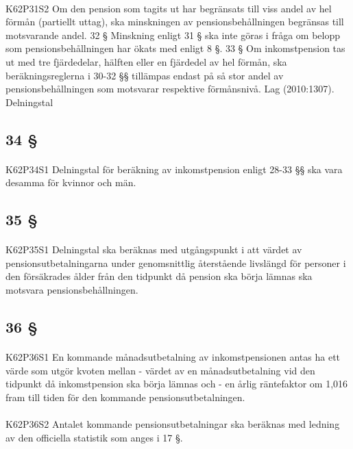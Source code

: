 \documentclass[a4paper,notitlepage,openany,10pt]{book}
\begin{document}
\paragraph*{}
{\tiny K62P31S2}
Om den pension som tagits ut har begränsats till viss andel av hel förmån (partiellt uttag), ska minskningen av pensionsbehållningen begränsas till motsvarande andel. 32 § Minskning enligt 31 § ska inte göras i fråga om belopp som pensionsbehållningen har ökats med enligt 8 §. 33 § Om inkomstpension tas ut med tre fjärdedelar, hälften eller en fjärdedel av hel förmån, ska beräkningsreglerna i 30-32 §§ tillämpas endast på så stor andel av pensionsbehållningen som motsvarar respektive förmånsnivå.
Lag (2010:1307).
Delningstal
\subsection*{34 §}
\paragraph*{}
{\tiny K62P34S1}
Delningstal för beräkning av inkomstpension enligt 28-33 §§ ska vara desamma för kvinnor och män.
\subsection*{35 §}
\paragraph*{}
{\tiny K62P35S1}
Delningstal ska beräknas med utgångspunkt i att värdet av pensionsutbetalningarna under genomsnittlig återstående livslängd för personer i den försäkrades ålder från den tidpunkt då pension ska börja lämnas ska motsvara pensionsbehållningen.
\subsection*{36 §}
\paragraph*{}
{\tiny K62P36S1}
En kommande månadsutbetalning av inkomstpensionen antas ha ett värde som utgör kvoten mellan
\newline - värdet av en månadsutbetalning vid den tidpunkt då inkomstpension ska börja lämnas och
\newline - en årlig räntefaktor om 1,016 fram till tiden för den kommande pensionsutbetalningen.
\paragraph*{}
{\tiny K62P36S2}
Antalet kommande pensionsutbetalningar ska beräknas med ledning av den officiella statistik som anges i 17 §.
\end{document}
